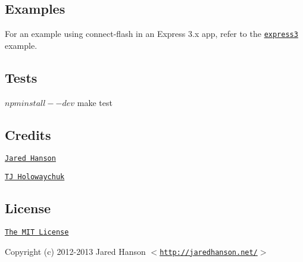 \subsection*{Examples}

For an example using connect-\/flash in an Express 3.\+x app, refer to the \href{https://github.com/jaredhanson/connect-flash/tree/master/examples/express3}{\tt express3} example.

\subsection*{Tests}

\begin{DoxyVerb}$ npm install --dev
$ make test
\end{DoxyVerb}


\href{http://travis-ci.org/jaredhanson/connect-flash}{\tt }

\subsection*{Credits}


\begin{DoxyItemize}
\item \href{http://github.com/jaredhanson}{\tt Jared Hanson}
\item \href{https://github.com/visionmedia}{\tt TJ Holowaychuk}
\end{DoxyItemize}

\subsection*{License}

\href{http://opensource.org/licenses/MIT}{\tt The M\+IT License}

Copyright (c) 2012-\/2013 Jared Hanson $<$\href{http://jaredhanson.net/}{\tt http\+://jaredhanson.\+net/}$>$ 